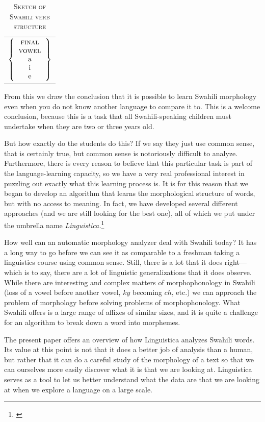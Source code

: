 \documentclass[output=paper,colorlinks,citecolor=brown,
]{langscibook}
\begin{document}
\begin{table}
\begin{tabular}{l}
$\left\{ \begin{tabular}{c} \textsc{final}\\ \textsc{vowel}\\a\\i\\e  \end{tabular}  \right\}$

\end{tabular}
\caption{\textsc{Sketch of Swahili verb structure}}
\label{sketch1}
\end{table}
 
From this we draw the conclusion that it is possible to learn Swahili morphology even when you do not know another language to compare it to. This is a welcome conclusion, because this is a task that all Swahili-speaking children must undertake when they are two or three years old. 

But how exactly do the students do this? If we say they just use common sense, that is certainly true, but common sense is notoriously difficult to analyze. Furthermore, there is every reason to believe that this particular task is part of the language-learning capacity, so we have a very real professional interest in puzzling out exactly what this learning process is. It is for this reason that we began to develop an algorithm that learns the morphological structure of words, but with no access to meaning. In fact, we have developed several different approaches (and we are still looking for the best one), all of which we put under the umbrella name \textit{Linguistica.}\footnote{\citep{Goldsmith2001, Goldsmith2006, Goldsmith2010}}  

How well can an automatic morphology analyzer deal with Swahili today? It has a long way to go before we can see it as comparable to a freshman taking a linguistics course using common sense. Still, there is a lot that it does right---which is to say, there are a lot of linguistic generalizations that it does observe. While there are interesting and complex matters of morphophonology in Swahili (loss of a vowel before another vowel, $ky$ becoming $ch$, etc.) we can approach the problem of morphology before solving problems of morphophonology. What Swahili offers is a large range of affixes of similar sizes, and it is quite a challenge for an algorithm to break down a word into morphemes.

The present paper offers an overview of how Linguistica analyzes Swahili words. Its value at this point is not that it does a better job of analysis than a human, but rather that it can do a careful study of the morphology of a text so that we can ourselves more easily discover what it is that we are looking at. Linguistica serves as a tool to let us better understand what the data are that we are looking at when we explore a language on a large scale.
\end{document}
